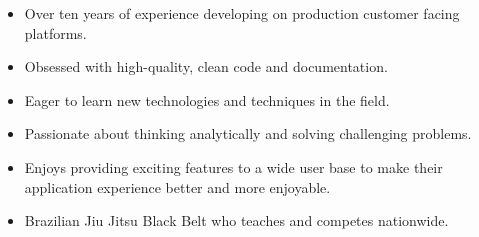 \documentclass[10pt,a4paper]{resume}
\begin{document}





\begin{fullwidth}
\makecvheader
\end{fullwidth}





\begin{itemize}
\item Over ten years of experience developing on production customer facing platforms.
\item Obsessed with high-quality, clean code and documentation.
\item Eager to learn new technologies and techniques in the field.
\item Passionate about thinking analytically and solving challenging problems.
\item Enjoys providing exciting features to a wide user base to make their application experience better and more enjoyable.
\item Brazilian Jiu Jitsu Black Belt who teaches and competes nationwide.
\end{itemize}

\end{document}

